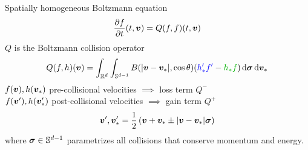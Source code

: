 \documentclass[hyperref={bookmarksopen, colorlinks, linkcolor=blue, urlcolor=green, citecolor=red}, color={usenames,dvipsnames}]{beamer}
\begin{document}

\begin{frame}{Spatially homogeneous Boltzmann equation}
\[
    \frac{\partial f}{\partial t}(t,{\bm v}) = Q(f,f)(t,{\bm v})
\]
$Q$ is the Boltzmann collision operator
\[
    Q(f,h)(\Bv) = \int_{\bbR^d} \int_{\bbS^{d-1}} B(|\Bv-\Bv_\ast|,\cos\theta) (
    {\color{blue} h_\ast'f'} - 
    {\color{darkgreen} h_\ast f}
    ) \dd\Bsigma \dd\Bv_\ast
\]
{\color{darkgreen} $f({\bm v}), h({\bm v}_\ast)$} pre-collisional velocities $\implies$ {\color{red}loss} term $Q^-$ \\ 
{\color{blue} $f({\bm v}'), h({\bm v}_\ast')$} post-collisional velocities $\implies$ {\color{red}gain} term $Q^+$
\[
    {\bm v}',{\bm v}_\ast' = \frac{1}{2}\left( {\bm v} + {\bm v}_\ast \pm |{\bm v}-{\bm v}_\ast|{\bm\sigma} \right)
\]
where ${\bm\sigma}\in\mathbb{S}^{d-1}$ parametrizes all collisions that conserve momentum and energy.
\end{frame}
\end{document}
